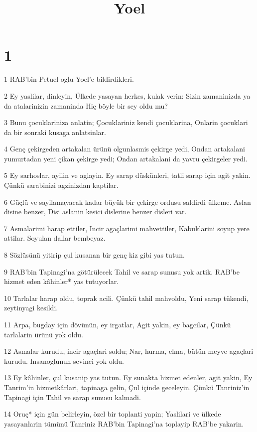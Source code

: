 

\title{Yoel}


\chapter{1}

\par 1 RAB'bin Petuel oglu Yoel'e bildirdikleri.
\par 2 Ey yaslilar, dinleyin, Ülkede yasayan herkes, kulak verin: Sizin zamaninizda ya da atalarinizin zamaninda Hiç böyle bir sey oldu mu?
\par 3 Bunu çocuklariniza anlatin; Çocuklariniz kendi çocuklarina, Onlarin çocuklari da bir sonraki kusaga anlatsinlar.
\par 4 Genç çekirgeden artakalan ürünü olgunlasmis çekirge yedi, Ondan artakalani yumurtadan yeni çikan çekirge yedi; Ondan artakalani da yavru çekirgeler yedi.
\par 5 Ey sarhoslar, ayilin ve aglayin. Ey sarap düskünleri, tatli sarap için agit yakin. Çünkü sarabinizi agzinizdan kaptilar.
\par 6 Güçlü ve sayilamayacak kadar büyük bir çekirge ordusu saldirdi ülkeme. Aslan disine benzer, Disi aslanin kesici dislerine benzer disleri var.
\par 7 Asmalarimi harap ettiler, Incir agaçlarimi mahvettiler, Kabuklarini soyup yere attilar. Soyulan dallar bembeyaz.
\par 8 Sözlüsünü yitirip çul kusanan bir genç kiz gibi yas tutun.
\par 9 RAB'bin Tapinagi'na götürülecek Tahil ve sarap sunusu yok artik. RAB'be hizmet eden kâhinler* yas tutuyorlar.
\par 10 Tarlalar harap oldu, toprak acili. Çünkü tahil mahvoldu, Yeni sarap tükendi, zeytinyagi kesildi.
\par 11 Arpa, bugday için dövünün, ey irgatlar, Agit yakin, ey bagcilar, Çünkü tarlalarin ürünü yok oldu.
\par 12 Asmalar kurudu, incir agaçlari soldu; Nar, hurma, elma, bütün meyve agaçlari kurudu. Insanoglunun sevinci yok oldu.
\par 13 Ey kâhinler, çul kusanip yas tutun. Ey sunakta hizmet edenler, agit yakin, Ey Tanrim'in hizmetkârlari, tapinaga gelin, Çul içinde geceleyin. Çünkü Tanriniz'in Tapinagi için Tahil ve sarap sunusu kalmadi.
\par 14 Oruç* için gün belirleyin, özel bir toplanti yapin; Yaslilari ve ülkede yasayanlarin tümünü Tanriniz RAB'bin Tapinagi'na toplayip RAB'be yakarin.

